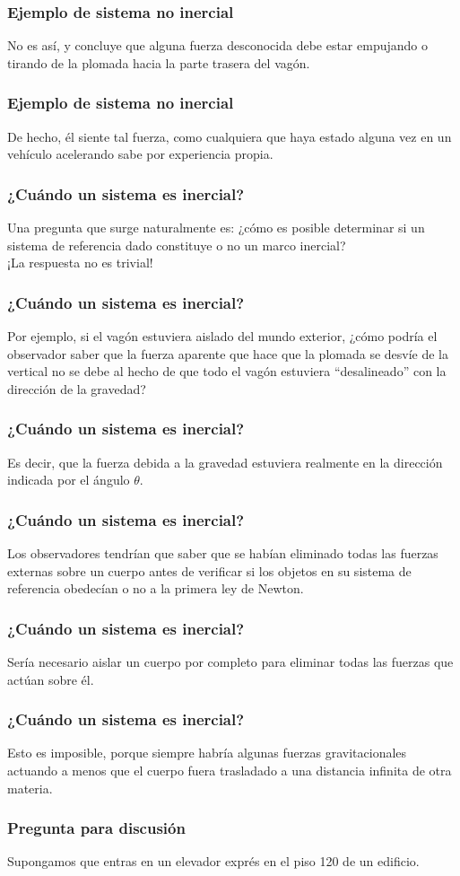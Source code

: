 \documentclass[12pt]{beamer}
\begin{document}
\begin{frame}
\frametitle{Ejemplo de sistema no inercial}
No es así, y concluye que alguna fuerza desconocida debe estar empujando o tirando de la plomada hacia la parte trasera del vagón.
\end{frame}
\begin{frame}
\frametitle{Ejemplo de sistema no inercial}
De hecho, él siente tal fuerza, como cualquiera que haya estado alguna vez en un vehículo acelerando sabe por experiencia propia.
\end{frame}
\begin{frame}
\frametitle{¿Cuándo un sistema es inercial?}
Una pregunta que surge naturalmente es: ¿cómo es posible determinar si un sistema de referencia dado constituye o no un marco inercial?
\\
\bigskip
\pause 
¡La respuesta no es trivial!
\end{frame}
\begin{frame}
\frametitle{¿Cuándo un sistema es inercial?}
Por ejemplo, si el vagón estuviera aislado del mundo exterior, \pause ¿cómo podría el observador saber que la fuerza aparente que hace que la plomada se desvíe de la vertical no se debe al hecho de que todo el vagón estuviera \enquote{desalineado} con la dirección de la gravedad?
\end{frame}
\begin{frame}
\frametitle{¿Cuándo un sistema es inercial?}
Es decir, que la fuerza debida a la gravedad estuviera realmente en la dirección indicada por el ángulo $\theta$.
\end{frame}
\begin{frame}
\frametitle{¿Cuándo un sistema es inercial?}
Los observadores tendrían que saber que se habían eliminado todas las fuerzas externas sobre un cuerpo antes de verificar si los objetos en su sistema de referencia obedecían o no a la primera ley de Newton.
\end{frame}
\begin{frame}
\frametitle{¿Cuándo un sistema es inercial?}
Sería necesario aislar un cuerpo por completo para eliminar todas las fuerzas que actúan sobre él.
\end{frame}
\begin{frame}
\frametitle{¿Cuándo un sistema es inercial?}
Esto es imposible, porque siempre habría algunas fuerzas gravitacionales actuando a menos que el cuerpo fuera trasladado a una distancia infinita de otra materia.
\end{frame}
\begin{frame}
\frametitle{Pregunta para discusión}
Supongamos que entras en un elevador exprés en el piso 120 de un edificio.
\end{frame}
\end{document}
